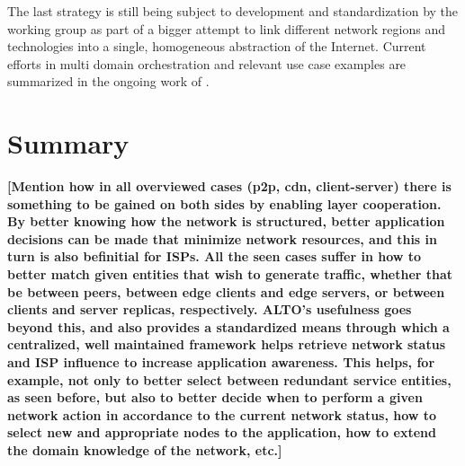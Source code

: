     The last strategy is still being subject to development and standardization by the working group as part of a bigger attempt to link different network regions and technologies into a single, homogeneous abstraction of the Internet.
    Current efforts in multi domain orchestration and relevant use case examples are summarized in the ongoing work of \cite{ALTO-multi-domain-use-cases(draft)}.

\section{Summary}


\textbf{[Mention how in all overviewed cases (p2p, cdn, client-server) there is something to be gained on both sides by enabling layer cooperation. By better knowing how the network is structured, better application decisions can be made that minimize network resources, and this in turn is also befinitial for ISPs. All the seen cases suffer in how to better match given entities that wish to generate traffic, whether that be between peers, between edge clients and edge servers, or between clients and server replicas, respectively. ALTO's usefulness goes beyond this, and also provides a standardized means through which a centralized, well maintained  framework helps retrieve network status and ISP influence to increase application awareness. This helps, for example, not only to better select between redundant service entities, as seen before, but also to better decide when to perform a given network action in accordance to the current network status, how to select new and appropriate nodes to the application, how to extend the domain knowledge of the network, etc.]}
